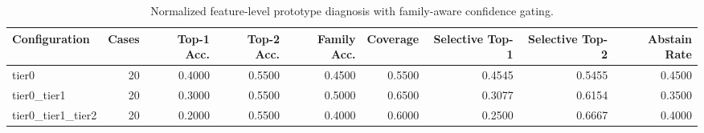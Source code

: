 \begin{table}[t]
\centering
\caption{Normalized feature-level prototype diagnosis with family-aware confidence gating.}
\label{tab:dice_stressor_hierarchical_diagnosis}
\footnotesize
\begin{tabular}{lrrrrrrrr}
\toprule
Configuration & Cases & Top-1 Acc. & Top-2 Acc. & Family Acc. & Coverage & Selective Top-1 & Selective Top-2 & Abstain Rate \\
\midrule
tier0 & 20 & 0.4000 & 0.5500 & 0.4500 & 0.5500 & 0.4545 & 0.5455 & 0.4500 \\
tier0_tier1 & 20 & 0.3000 & 0.5500 & 0.5000 & 0.6500 & 0.3077 & 0.6154 & 0.3500 \\
tier0_tier1_tier2 & 20 & 0.2000 & 0.5500 & 0.4000 & 0.6000 & 0.2500 & 0.6667 & 0.4000 \\
\bottomrule
\end{tabular}

\end{table}
